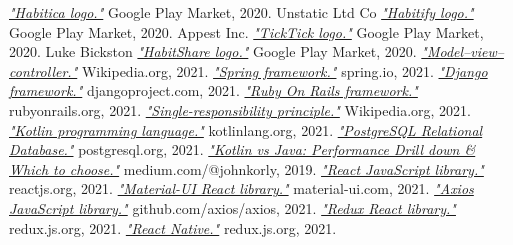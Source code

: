 \documentclass[twoside]{ctuthesis}
\begin{document}
\begin{thebibliography}{99}
        \href{https://play.google.com/store/apps/details?id=com.habitrpg.android.habitica}{\emph{"Habitica logo."}}
        Google Play Market, 2020.
        Unstatic Ltd Co
        \href{https://play.google.com/store/apps/details?id=co.unstatic.habitify}{\emph{"Habitify logo."}}
        Google Play Market, 2020.
        Appest Inc.
        \href{https://play.google.com/store/apps/details?id=com.ticktick.task}{\emph{"TickTick logo."}}
        Google Play Market, 2020.
        Luke Bickston
        \href{https://play.google.com/store/apps/details?id=com.habitshareapp}{\emph{"HabitShare logo."}}
        Google Play Market, 2020.
        \href{https://en.wikipedia.org/wiki/Model\%E2\%80\%93view\%E2\%80\%93controller}{\emph{"Model–view–controller."}}
        Wikipedia.org, 2021.
        \href{https://spring.io/}{\emph{"Spring framework."}}
        spring.io, 2021.
        \href{https://www.djangoproject.com/}{\emph{"Django framework."}}
        djangoproject.com, 2021.
        \href{https://spring.io/}{\emph{"Ruby On Rails framework."}}
        rubyonrails.org, 2021.
        \href{https://en.wikipedia.org/wiki/Single-responsibility_principle}{\emph{"Single-responsibility principle."}}
        Wikipedia.org, 2021.
        \href{https://kotlinlang.org/}{\emph{"Kotlin programming language."}}
        kotlinlang.org, 2021.
        \href{https://www.postgresql.org/}{\emph{"PostgreSQL Relational Database."}}
        postgresql.org, 2021.
        \href{https://medium.com/@johnkorly/kotlin-vs-java-performance-drill-down-which-to-choose-2514bdf91916}{\emph{"Kotlin vs Java: Performance Drill down \& Which to choose."}}
        medium.com/@johnkorly, 2019.
        \href{https://reactjs.org/}{\emph{"React JavaScript library."}}
        reactjs.org, 2021.
        \href{https://material-ui.com/}{\emph{"Material-UI React library."}}
        material-ui.com, 2021.
        \href{https://github.com/axios/axios}{\emph{"Axios JavaScript library."}}
        github.com/axios/axios, 2021.
        \href{https://redux.js.org/}{\emph{"Redux React library."}}
        redux.js.org, 2021.
        \href{https://reactnative.dev/}{\emph{"React Native."}}
        redux.js.org, 2021.

\end{thebibliography}
\end{document}

